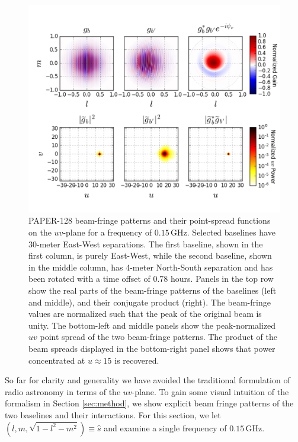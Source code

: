 \documentclass[twocolumn,apj,numberedappendix]{emulateapj}
\renewcommand\[{\begin{equation}}
\renewcommand\]{\end{equation}}
\begin{document}
\begin{figure}[h!]
\includegraphics[width=\textwidth]{BeamFringe}

\caption{PAPER-128 beam-fringe patterns and their point-spread functions on the $uv$-plane for a frequency of $0.15$\,GHz. Selected baselines have 30-meter East-West separations. The first baseline, shown in the first column, is purely East-West, while the second baseline, shown in the middle column, has 4-meter North-South separation and has been rotated with a time offset of 0.78 hours. Panels in the top row show the real parts of the beam-fringe patterns of the baselines (left and middle), and their conjugate product (right). The beam-fringe values are normalized such that the peak of the original beam is unity. 
The bottom-left and middle panels show the peak-normalized $uv$ point spread of the two beam-fringe patterns. The product of the beam spreads displayed in the bottom-right panel shows that power concentrated at $u\approx15$ is recovered. }
\label{fig:beamfringe}
\end{figure}

So far for clarity and generality we have avoided the traditional formulation of radio astronomy in terms of the $uv$-plane. To gain some visual intuition of the formalism in Section \ref{sec:method}, we show explicit beam fringe patterns of the two baselines and their interactions. For this section, we let $(l,m,\sqrt{1-l^2-m^2})\equiv\hat{s}$ and examine a single frequency of $0.15$\,GHz. 
\end{document}
